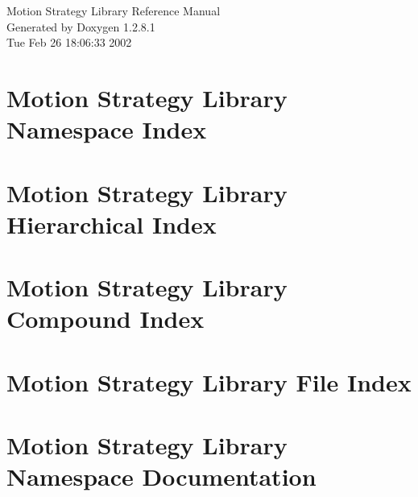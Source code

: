 \documentclass[letterpaper]{book}
\begin{document}
\begin{titlepage}
\vspace*{7cm}
\begin{center}
{\Large Motion Strategy Library Reference Manual}\\
\vspace*{1cm}
{\large Generated by Doxygen 1.2.8.1}\\
\vspace*{0.5cm}
{\small Tue Feb 26 18:06:33 2002}\\
\end{center}
\end{titlepage}
\clearemptydoublepage
{}
\tableofcontents
\clearemptydoublepage
{}
\chapter{Motion Strategy Library Namespace Index}

\chapter{Motion Strategy Library Hierarchical Index}

\chapter{Motion Strategy Library Compound Index}

\chapter{Motion Strategy Library File Index}

\chapter{Motion Strategy Library Namespace Documentation}

\end{document}
